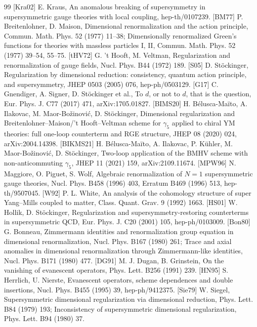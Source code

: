 \documentclass[11pt]{article}
\theoremstyle{definition}
\numberwithin{equation}{section}
\begin{document}
\begin{thebibliography}{99}
 [Kra02] E. Kraus, An anomalous breaking of supersymmetry in supersymmetric gauge theories with local coupling, hep-th/0107239.
 [BM77] P. Breitenlohner, D. Maison, Dimensional renormalization and the action principle, Commun. Math. Phys. 52 (1977) 11--38; Dimensionally renormalized Green's functions for theories with massless particles I, II, Commun. Math. Phys. 52 (1977) 39--54, 55--75.
 [tHV72] G. 't Hooft, M. Veltman, Regularization and renormalization of gauge fields, Nucl. Phys. B44 (1972) 189.
 [S05] D. St\"ockinger, Regularization by dimensional reduction: consistency, quantum action principle, and supersymmetry, JHEP 0503 (2005) 076, hep-ph/0503129.
 [G17] C. Gnendiger, A. Signer, D. St\"ockinger et al., To $d$, or not to $d$, that is the question, Eur. Phys. J. C77 (2017) 471, arXiv:1705.01827.
 [BIMS20] H. B\'elusca-Ma\"ito, A. Ilakovac, M. Ma\dj or-Bo\v zinovi\'c, D. St\"ockinger, Dimensional regularization and Breitenlohner--Maison/'t Hooft--Veltman scheme for $\gamma_5$ applied to chiral YM theories: full one-loop counterterm and RGE structure, JHEP 08 (2020) 024, arXiv:2004.14398.
 [BIKMS21] H. B\'elusca-Ma\"ito, A. Ilakovac, P. K\"uhler, M. Ma\dj or-Bo\v zinovi\'c, D. St\"ockinger, Two-loop application of the BMHV scheme with non-anticommuting $\gamma_5$, JHEP 11 (2021) 159, arXiv:2109.11674.
 [MPW96] N. Maggiore, O. Piguet, S. Wolf, Algebraic renormalization of $N=1$ supersymmetric gauge theories, Nucl. Phys. B458 (1996) 403, Erratum B469 (1996) 513, hep-th/9507045.
 [W92] P. L. White, An analysis of the cohomology structure of super Yang--Mills coupled to matter, Class. Quant. Grav. 9 (1992) 1663.
 [HS01] W. Hollik, D. St\"ockinger, Regularization and supersymmetry-restoring counterterms in supersymmetric QCD, Eur. Phys. J. C20 (2001) 105, hep-ph/0103009.
 [Bon80] G. Bonneau, Zimmermann identities and renormalization group equation in dimensional renormalization, Nucl. Phys. B167 (1980) 261; Trace and axial anomalies in dimensional renormalization through Zimmermann-like identities, Nucl. Phys. B171 (1980) 477.
 [DG91] M. J. Dugan, B. Grinstein, On the vanishing of evanescent operators, Phys. Lett. B256 (1991) 239.
 [HN95] S. Herrlich, U. Nierste, Evanescent operators, scheme dependences and double insertions, Nucl. Phys. B455 (1995) 39, hep-ph/9412375.
 [Sie79] W. Siegel, Supersymmetric dimensional regularization via dimensional reduction, Phys. Lett. B84 (1979) 193; Inconsistency of supersymmetric dimensional regularization, Phys. Lett. B94 (1980) 37.

\end{thebibliography}
\end{document}

